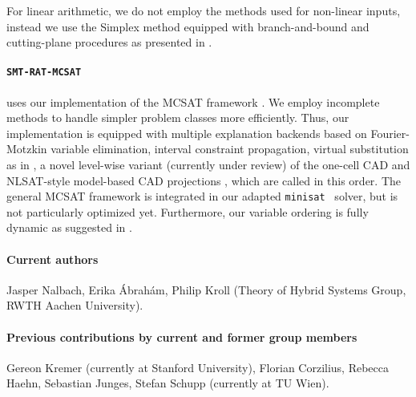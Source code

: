 \documentclass{article}
\begin{document}
For linear arithmetic, we do not employ the methods used for non-linear inputs, instead we use the Simplex method equipped with branch-and-bound and cutting-plane procedures as presented in \cite{DM06}.
\fi

\paragraph{\texttt{SMT-RAT-MCSAT}} uses our implementation of the MCSAT framework \cite{Moura2013}.
We employ incomplete methods to handle simpler problem classes more efficiently. Thus, our implementation is equipped with multiple explanation backends based on Fourier-Motzkin variable elimination, interval constraint propagation, virtual substitution as in \cite{Abraham2017}, a novel level-wise variant (currently under review) of the one-cell CAD \cite{brown2015constructing} and NLSAT-style model-based CAD projections \cite{jovanovic2012solving}, which are called in this order. The general MCSAT framework is integrated in our adapted \texttt{minisat}~\cite{Een2003} solver, but is not particularly optimized yet.
Furthermore, our variable ordering is fully dynamic as suggested in \cite{Jovanovic2013}.


\paragraph{Current authors}
Jasper Nalbach, Erika \'Abrah\'am, Philip Kroll
(Theory of Hybrid Systems Group, RWTH Aachen University).

\paragraph{Previous contributions by current and former group members}
Gereon Kremer (currently at Stanford University),
Florian Corzilius,
Rebecca Haehn,
Sebastian Junges,
Stefan Schupp (currently at TU Wien).




\end{document}
